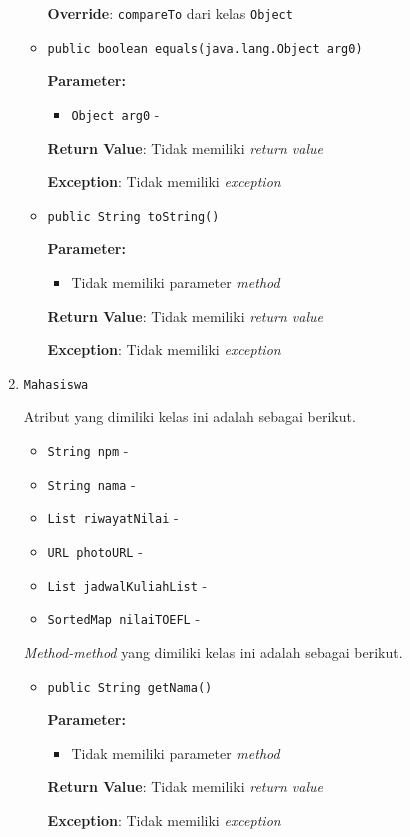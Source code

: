 \documentclass{article}
\begin{document}
\begin{enumerate}
\begin{itemize}
\textbf{Override}: \texttt{compareTo} dari kelas \texttt{Object}

\item \texttt{public boolean equals(java.lang.Object arg0)}

\textbf{Parameter:}
\begin{itemize}
\item \texttt{Object arg0} - 
\end{itemize}
\textbf{Return Value}: Tidak memiliki \textit{return value}

\textbf{Exception}: Tidak memiliki \textit{exception}

\item \texttt{public String toString()}

\textbf{Parameter:}
\begin{itemize}
\item Tidak memiliki parameter \textit{method}
\end{itemize}
\textbf{Return Value}: Tidak memiliki \textit{return value}

\textbf{Exception}: Tidak memiliki \textit{exception}

\end{itemize}
\item \texttt{Mahasiswa}



Atribut yang dimiliki kelas ini adalah sebagai berikut.
\begin{itemize}
\item \texttt{String npm} - 
\item \texttt{String nama} - 
\item \texttt{List riwayatNilai} - 
\item \texttt{URL photoURL} - 
\item \texttt{List jadwalKuliahList} - 
\item \texttt{SortedMap nilaiTOEFL} - 
\end{itemize}
\textit{Method-method} yang dimiliki kelas ini adalah sebagai berikut.
\begin{itemize}
\item \texttt{public String getNama()}

\textbf{Parameter:}
\begin{itemize}
\item Tidak memiliki parameter \textit{method}
\end{itemize}
\textbf{Return Value}: Tidak memiliki \textit{return value}

\textbf{Exception}: Tidak memiliki \textit{exception}


\end{itemize}
\end{enumerate}
\end{document}
